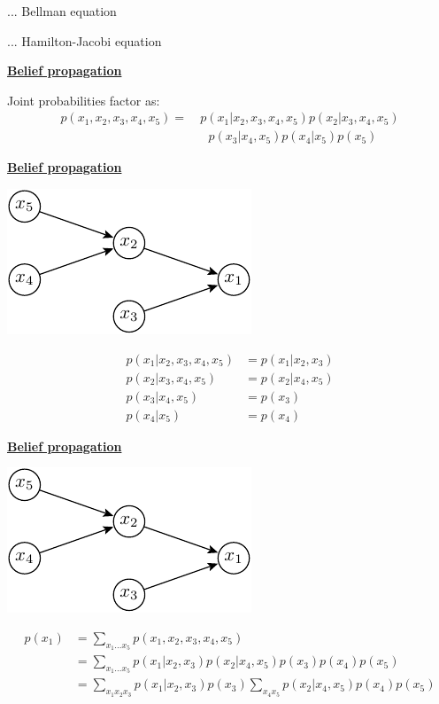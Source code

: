 \documentclass[11pt]{article}
\def\heading #1{\centerline{\underline{\bf\LARGE #1}}}
\def\vsp {\vskip 0.5cm}
\begin{document}
\vsp
... Bellman equation

... Hamilton-Jacobi equation


\newpage %

\heading{Belief propagation}

\vsp
Joint probabilities factor as:
\begin{align*}
    p(x_1, x_2, x_3, x_4, x_5) = \ & p(x_1 | x_2, x_3, x_4, x_5)  p(x_2 | x_3, x_4, x_5) \\
        & \ \ \ p(x_3 | x_4, x_5) p( x_4 | x_5) p( x_5) 
\end{align*}

\newpage %

\heading{Belief propagation}

\centerline{\includegraphics[]{pic-belief.pdf}}

\begin{align*}
    p(x_1 | x_2, x_3, x_4, x_5) &= p(x_1 | x_2, x_3) \\
    p(x_2 | x_3, x_4, x_5) &= p(x_2 | x_4, x_5)  \\
    p(x_3 | x_4, x_5)  &= p(x_3) \\
    p(x_4 | x_5) &= p(x_4)
\end{align*}

\newpage %

\heading{Belief propagation}
\centerline{\includegraphics[]{pic-belief.pdf}}
\begin{align*}
    p(x_1) &= \sum_{x_1...x_5} p(x_1, x_2, x_3, x_4, x_5) \\
    &= \sum_{x_1...x_5} p(x_1 | x_2, x_3)  p(x_2 | x_4, x_5) p(x_3) p(x_4) p( x_5)  \\
    &= \sum_{x_1x_2x_3} p(x_1 | x_2, x_3)  p(x_3) \sum_{x_4 x_5} p(x_2 | x_4, x_5) p(x_4) p( x_5) 
\end{align*}
\end{document}
